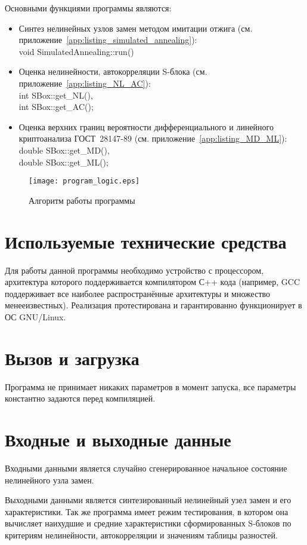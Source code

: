 Основными функциями программы являются:
\begin{itemize}

    \item Синтез нелинейных узлов замен методом имитации отжига
    (см. приложение~\ref{app:listing_simulated_annealing}): \\
    void SimulatedAnnealing::run()

    \item Оценка нелинейности, автокорреляции S-блока (см. приложение~\ref{app:listing_NL_AC}): \\ 
    int SBox::get\_NL(), \\
    int SBox::get\_AC();

    \item Оценка верхних границ вероятности дифференциального и линейного
    криптоанализа ГОСТ~28147-89 (см. приложение~\ref{app:listing_MD_ML}): \\
    double SBox::get\_MD(), \\
    double SBox::get\_ML();

\end{itemize}

\begin{figure}
    \centering\texttt{[image: program\_logic.eps]}
    \caption{Алгоритм работы программы}
    \label{fig:program_logic}
\end{figure}


\section{Используемые технические средства}

Для работы данной программы необходимо устройство с процессором, архитектура
которого поддерживается компилятором С++ кода (например, GCC поддерживает все
наиболее распространённые архитектуры и множество менееизвестных). Реализация
протестирована и гарантированно функционирует в ОС GNU/Linux. 

\section{Вызов и загрузка}

Программа не принимает никаких параметров в момент запуска, все параметры
константно задаются перед компиляцией.

\section{Входные и выходные данные}

Входными данными является случайно сгенерированное начальное состояние
нелинейного узла замен.

Выходными данными является синтезированный нелинейный узел замен и его
характеристики. Так же программа имеет режим тестирования, в котором она
вычисляет наихудшие и средние характеристики сформированных S-блоков по
критериям нелинейности, автокорреляции и значениям таблицы разностей.
